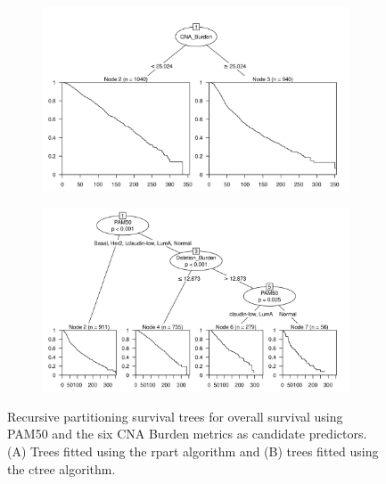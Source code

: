 \begin{figure}[!htb]
\centering

\vspace{0.5cm}

\begin{subfigure}{\textwidth}
\subcaption{}
\includegraphics[width=1\textwidth]{../figures/Appendices/Appendix_B/PartyKit_Survival_Burden_OS_PAM50.png}
\end{subfigure}

\vspace{2cm}

\begin{subfigure}{\textwidth}
\subcaption{}
\includegraphics[width=1\textwidth]{../figures/Appendices/Appendix_B/Ctree_Survival_Burden_OS_PAM50.png}
\end{subfigure}

\vspace{0.5cm}

\caption[Recursive partitioning survival trees for overall survival using PAM50 and the six CNA Burden metrics as candidate predictors.]{Recursive partitioning survival trees for overall survival using PAM50 and the six CNA Burden metrics as candidate predictors. (A) Trees fitted using the rpart algorithm and (B) trees fitted using the ctree algorithm.}
\end{figure}

